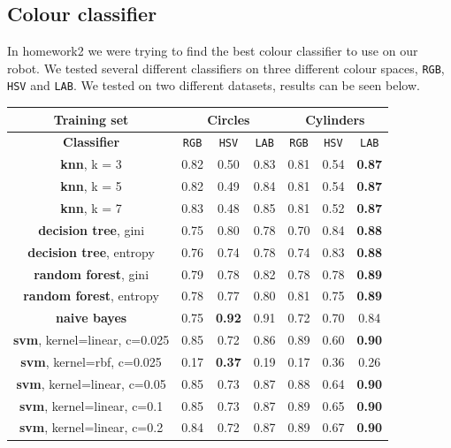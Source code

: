 \documentclass[12pt,a4paper]{article}
\begin{document}
	\subsection{Colour classifier}
	In homework2 we were trying to find the best colour classifier to use on our robot. We tested several different classifiers on three different colour spaces, \texttt{RGB}, \texttt{HSV} and \texttt{LAB}. We tested on two different datasets, results can be seen below. \\
	
	\begin{center}
		\begin{tabular}{|c|c|c|c||c|c|c|}
			\hline
			Training set & \multicolumn{3}{c||}{\textbf{Circles}} & \multicolumn{3}{c|}{\textbf{Cylinders}} \\
			\hline
			\hline 
			\textbf{Classifier} & \texttt{RGB} & \texttt{HSV} & \texttt{LAB} & \texttt{RGB} & \texttt{HSV} & \texttt{LAB} \\
			\hline \hline
			\textbf{knn}, \small k = 3 & 0.82 & 0.50 & 0.83 & 0.81 & 0.54 & \textbf{0.87} \\
			\textbf{knn}, \small k = 5 & 0.82 & 0.49 & 0.84 & 0.81 & 0.54 & \textbf{0.87} \\
			\textbf{knn}, \small k = 7 & 0.83 & 0.48 & 0.85 & 0.81 & 0.52 & \textbf{0.87} \\
			\hline \hline
			\textbf{decision tree}, \small gini & 0.75 & 0.80 & 0.78 & 0.70 & 0.84 & \textbf{0.88} \\
			\textbf{decision tree}, \small entropy & 0.76 & 0.74 & 0.78 & 0.74 & 0.83 & \textbf{0.88} \\
			\hline \hline
			\textbf{random forest}, \small gini & 0.79 & 0.78 & 0.82 & 0.78 & 0.78 & \textbf{0.89} \\
			\textbf{random forest}, \small entropy & 0.78 & 0.77 & 0.80 & 0.81 & 0.75 & \textbf{0.89} \\
			\hline \hline
			\textbf{naive bayes} & 0.75 & \textbf{0.92} & 0.91 & 0.72 & 0.70 & 0.84 \\
			\hline \hline
			\textbf{svm}, \small kernel=linear, c=0.025 & 0.85 & 0.72 & 0.86 & 0.89 & 0.60 & \textbf{0.90} \\
			\textbf{svm}, \small kernel=rbf, c=0.025 & 0.17 & \textbf{0.37} & 0.19 & 0.17 & 0.36 & 0.26 \\
			\textbf{svm}, \small kernel=linear, c=0.05 & 0.85 & 0.73 & 0.87 & 0.88 & 0.64 & \textbf{0.90} \\
			\textbf{svm}, \small kernel=linear, c=0.1 & 0.85 & 0.73 & 0.87 & 0.89 & 0.65 & \textbf{0.90} \\
			\textbf{svm}, \small kernel=linear, c=0.2 & 0.84 & 0.72 & 0.87 & 0.89 & 0.67 & \textbf{0.90} \\
			\hline
		\end{tabular} \\
	\end{center}
\end{document}
